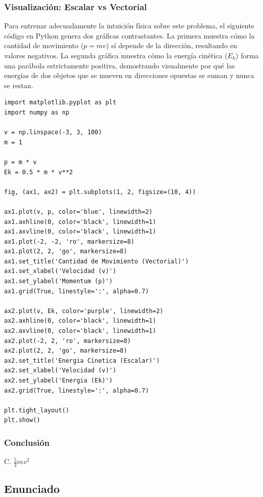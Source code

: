 \documentclass[12pt, a4paper]{article}
\begin{document}
\subsubsection*{Visualización: Escalar vs Vectorial}

Para entrenar adecuadamente la intuición física sobre este problema, el siguiente código en Python genera dos gráficas contrastantes. La primera muestra cómo la cantidad de movimiento ($p=mv$) sí depende de la dirección, resultando en valores negativos. La segunda gráfica muestra cómo la energía cinética ($E_k$) forma una parábola estrictamente positiva, demostrando visualmente por qué las energías de dos objetos que se mueven en direcciones opuestas se suman y nunca se restan.

\begin{lstlisting}
import matplotlib.pyplot as plt
import numpy as np

v = np.linspace(-3, 3, 100)
m = 1

p = m * v
Ek = 0.5 * m * v**2

fig, (ax1, ax2) = plt.subplots(1, 2, figsize=(10, 4))

ax1.plot(v, p, color='blue', linewidth=2)
ax1.axhline(0, color='black', linewidth=1)
ax1.axvline(0, color='black', linewidth=1)
ax1.plot(-2, -2, 'ro', markersize=8)
ax1.plot(2, 2, 'go', markersize=8)
ax1.set_title('Cantidad de Movimiento (Vectorial)')
ax1.set_xlabel('Velocidad (v)')
ax1.set_ylabel('Momentum (p)')
ax1.grid(True, linestyle=':', alpha=0.7)

ax2.plot(v, Ek, color='purple', linewidth=2)
ax2.axhline(0, color='black', linewidth=1)
ax2.axvline(0, color='black', linewidth=1)
ax2.plot(-2, 2, 'ro', markersize=8)
ax2.plot(2, 2, 'go', markersize=8)
ax2.set_title('Energia Cinetica (Escalar)')
ax2.set_xlabel('Velocidad (v)')
ax2.set_ylabel('Energia (Ek)')
ax2.grid(True, linestyle=':', alpha=0.7)

plt.tight_layout()
plt.show()
\end{lstlisting}

\subsubsection*{Conclusión}

C. $\frac{5}{2}mv^2$


\newpage

\subsection*{Enunciado}
\end{document}
